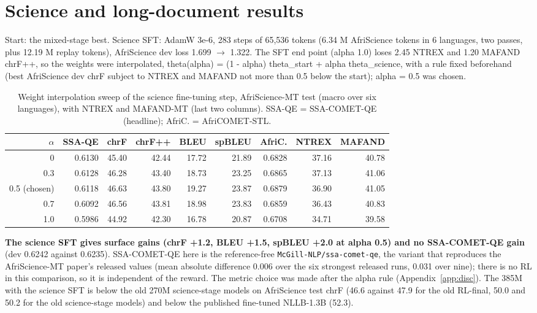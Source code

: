 \section{Science and long-document results}\label{app:docs}

Start: the mixed-stage best. Science SFT: AdamW 3e-6, 283 steps of 65,536 tokens (6.34 M AfriScience tokens in 6 languages, two passes, plus 12.19 M replay tokens), AfriScience dev loss 1.699 $\to$ 1.322. The SFT end point (alpha 1.0) loses 2.45 NTREX and 1.20 MAFAND chrF++, so the weights were interpolated, theta(alpha) = (1 - alpha) theta\_start + alpha theta\_science, with a rule fixed beforehand (best AfriScience dev chrF subject to NTREX and MAFAND not more than 0.5 below the start); alpha = 0.5 was chosen. 

\begin{table}[t]
\centering\footnotesize
\setlength{\tabcolsep}{4pt}
\caption{Weight interpolation sweep of the science fine-tuning step, AfriScience-MT test (macro over six languages), with NTREX and MAFAND-MT \chrfpp{} (last two columns). SSA-QE = SSA-COMET-QE (headline); AfriC. = AfriCOMET-STL.}\label{tab:alpha}
\begin{adjustbox}{max width=\linewidth}\begin{tabular}{@{}rrrrrrrrr@{}}
\toprule
$\alpha$ & SSA-QE & chrF & chrF++ & BLEU & spBLEU & AfriC. & NTREX & MAFAND \\
\midrule
0 & 0.6130 & 45.40 & 42.44 & 17.72 & 21.89 & 0.6828 & 37.16 & 40.78 \\
0.3 & 0.6128 & 46.28 & 43.40 & 18.73 & 23.25 & 0.6865 & 37.13 & 41.06 \\
0.5 (chosen) & 0.6118 & 46.63 & 43.80 & 19.27 & 23.87 & 0.6879 & 36.90 & 41.05 \\
0.7 & 0.6092 & 46.56 & 43.81 & 18.98 & 23.83 & 0.6859 & 36.43 & 40.83 \\
1.0 & 0.5986 & 44.92 & 42.30 & 16.78 & 20.87 & 0.6708 & 34.71 & 39.58 \\
\bottomrule
\end{tabular}\end{adjustbox}
\end{table}

\textbf{The science SFT gives surface gains (chrF +1.2, BLEU +1.5, spBLEU +2.0 at alpha 0.5) and no SSA-COMET-QE gain} (dev 0.6242 against 0.6235). SSA-COMET-QE here is the reference-free \texttt{McGill-\allowbreak{}NLP/\allowbreak{}ssa-\allowbreak{}comet-\allowbreak{}qe}, the variant that reproduces the AfriScience-MT paper's released values (mean absolute difference 0.006 over the six strongest released runs, 0.031 over nine); there is no RL in this comparison, so it is independent of the reward.  The metric choice was made after the alpha rule (Appendix~\ref{app:disc}). The 385M with the science SFT is below the old 270M science-stage models on AfriScience test chrF (46.6 against 47.9 for the old RL-final, 50.0 and 50.2 for the old science-stage models) and below the published fine-tuned NLLB-1.3B (52.3). 

